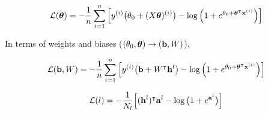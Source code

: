 



\begin{equation}\label{eq:logistic_cost_function}
    \mathcal{L}(\boldsymbol{\theta}) = -  \frac{1}{n}\sum_{i=1}^n \Big[ y^{(i)} \big(\theta_0 + (X\boldsymbol{\theta})^{(i)}\big) - \log{\Big(1+e^{\theta_0 + \boldsymbol{\theta}^\intercal\mathbf{x}^{(i)}}\Big)} \Big]
\end{equation}

In terms of weights and biases ($ (\theta_0,  \boldsymbol{\theta} ) \to (\mathbf{b}, W)$),

\begin{equation}\label{eq:logistic_cost_function_NN}
    \mathcal{L}(\mathbf{b}, W) = -  \frac{1}{n}\sum_{i=1}^n \Big[ y^{(i)} \big(\mathbf{b} + W^\intercal \mathbf{h}^{l}\big) - \log{\Big(1+e^{\theta_0 + \boldsymbol{\theta}^\intercal\mathbf{x}^{(i)}}\Big)} \Big]
\end{equation}

\begin{equation}\label{eq:logistic_cost_function_NN2}
    \mathcal{L}(l) = -  \frac{1}{N_l} \Big[ (\mathbf{h}^{l})^\intercal\mathbf{a}^{l} - \log{\big(1+e^{\mathbf{a}^{l}}\big)} \Big]
\end{equation}
